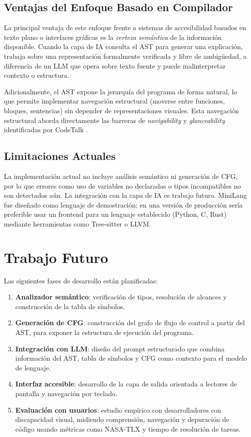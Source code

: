 \documentclass[conference]{IEEEtran}
\begin{document}
\subsection{Ventajas del Enfoque Basado en Compilador}

La principal ventaja de este enfoque frente a sistemas de accesibilidad basados en texto plano o interfaces gráficas es la \textit{certeza semántica} de la información disponible. Cuando la capa de IA consulta el AST para generar una explicación, trabaja sobre una representación formalmente verificada y libre de ambigüedad, a diferencia de un LLM que opera sobre texto fuente y puede malinterpretar contexto o estructura.

Adicionalmente, el AST expone la jerarquía del programa de forma natural, lo que permite implementar navegación estructural (moverse entre funciones, bloques, sentencias) sin depender de representaciones visuales. Esta navegación estructural aborda directamente las barreras de \textit{navigability} y \textit{glanceability} identificadas por CodeTalk \cite{codetalk}.

\subsection{Limitaciones Actuales}

La implementación actual no incluye análisis semántico ni generación de CFG, por lo que errores como uso de variables no declaradas o tipos incompatibles no son detectados aún. La integración con la capa de IA es trabajo futuro. MiniLang fue diseñado como lenguaje de demostración; en una versión de producción sería preferible usar un frontend para un lenguaje establecido (Python, C, Rust) mediante herramientas como Tree-sitter o LLVM.

\section{Trabajo Futuro}

Las siguientes fases de desarrollo están planificadas:

\begin{enumerate}
    \item \textbf{Analizador semántico}: verificación de tipos, resolución de alcances y construcción de la tabla de símbolos.
    \item \textbf{Generación de CFG}: construcción del grafo de flujo de control a partir del AST, para exponer la estructura de ejecución del programa.
    \item \textbf{Integración con LLM}: diseño del prompt estructurado que combina información del AST, tabla de símbolos y CFG como contexto para el modelo de lenguaje.
    \item \textbf{Interfaz accesible}: desarrollo de la capa de salida orientada a lectores de pantalla y navegación por teclado.
    \item \textbf{Evaluación con usuarios}: estudio empírico con desarrolladores con discapacidad visual, midiendo comprensión, navegación y depuración de código usando métricas como NASA-TLX y tiempo de resolución de tareas.
\end{enumerate}
\end{document}
